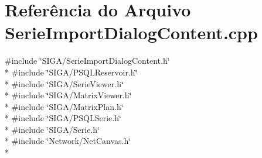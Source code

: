 \section{Referência do Arquivo Serie\+Import\+Dialog\+Content.\+cpp}
\label{_serie_import_dialog_content_8cpp}
{\ttfamily \#include \char`\"{}S\+I\+G\+A/\+Serie\+Import\+Dialog\+Content.\+h\char`\"{}}\\*
{\ttfamily \#include \char`\"{}S\+I\+G\+A/\+P\+S\+Q\+L\+Reservoir.\+h\char`\"{}}\\*
{\ttfamily \#include \char`\"{}S\+I\+G\+A/\+Serie\+Viewer.\+h\char`\"{}}\\*
{\ttfamily \#include \char`\"{}S\+I\+G\+A/\+Matrix\+Viewer.\+h\char`\"{}}\\*
{\ttfamily \#include \char`\"{}S\+I\+G\+A/\+Matrix\+Plan.\+h\char`\"{}}\\*
{\ttfamily \#include \char`\"{}S\+I\+G\+A/\+P\+S\+Q\+L\+Serie.\+h\char`\"{}}\\*
{\ttfamily \#include \char`\"{}S\+I\+G\+A/\+Serie.\+h\char`\"{}}\\*
{\ttfamily \#include \char`\"{}Network/\+Net\+Canvas.\+h\char`\"{}}\\*
